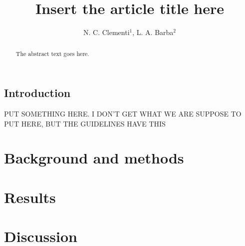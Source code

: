 \documentclass[openacc]{rstransa} %
\begin{document}
\title{Insert the article title here}

\author{%
N. C. Clementi$^{1}$, L. A. Barba$^{2}$}

\address{$^{1}$First author address\\
$^{2}$Second author address\\
$^{3}$Third author address}

\subject{xxxxx, xxxxx, xxxx}



\begin{abstract}
    The abstract text goes here. 
\end{abstract}
    
    
\begin{fmtext}  
\section{Introduction}

PUT SOMETHING HERE. I DON'T GET WHAT WE ARE SUPPOSE TO PUT HERE, BUT THE GUIDELINES HAVE THIS

\end{fmtext}

\maketitle
\section{Background and methods}\label{sec:background}


\section{Results} \label{sec:results}



\section{Discussion}\label{sec:discussion}


\newpage

\end{document}
